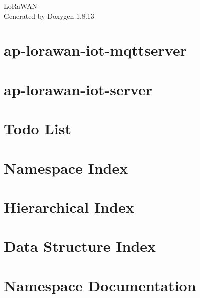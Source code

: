 \documentclass[twoside]{book}
\newcommand{\+}{\discretionary{\mbox{\scriptsize$\hookleftarrow$}}{}{}}
\newcommand{\clearemptydoublepage}{%
  \newpage{\pagestyle{empty}\cleardoublepage}%
}
\begin{document}
\hypersetup{pageanchor=false,
             bookmarksnumbered=true,
             pdfencoding=unicode
            }
\begin{titlepage}
\vspace*{7cm}
\begin{center}%
{\Large Lo\+Ra\+W\+AN }\\
\vspace*{1cm}
{\large Generated by Doxygen 1.8.13}\\
\end{center}
\end{titlepage}
\clearemptydoublepage
{}
\tableofcontents
\clearemptydoublepage
{}
\hypersetup{pageanchor=true}

\chapter{ap-\/lorawan-\/iot-\/mqttserver}
\label{md_servers_mqttserver__r_e_a_d_m_e}

\chapter{ap-\/lorawan-\/iot-\/server}
\label{md_servers_webserver__r_e_a_d_m_e}

\chapter{Todo List}
\label{todo}

\chapter{Namespace Index}

\chapter{Hierarchical Index}

\chapter{Data Structure Index}

\chapter{Namespace Documentation}





\end{document}
